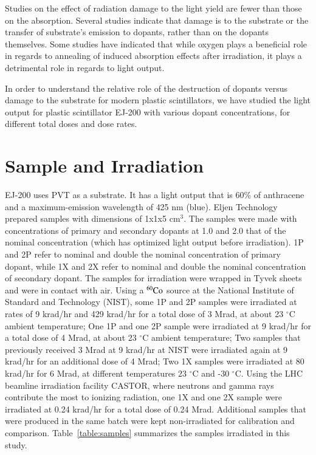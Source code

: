 \documentclass[review]{elsarticle}
\begin{document}
Studies on the effect of radiation damage to the light yield are fewer than those on the absorption. 
Several studies indicate that damage is to the substrate or the transfer of substrate's emission to dopants, 
rather than on the dopants themselves.
Some studies have indicated that while oxygen plays a beneficial role in regards to annealing of induced absorption effects after 
irradiation, it plays a detrimental role in regards to light output\cite{Biagtan1996125}. 

In order to understand the relative role of the destruction of dopants versus damage to the substrate for modern plastic scintillators, 
we have studied the light output for plastic scintillator EJ-200 with various dopant concentrations, 
for different total doses and dose rates. 

\section{Sample and Irradiation}
EJ-200 uses PVT as a substrate. It has a light output that is 60\% of anthracene and a maximum-emission wavelength of 425 nm (blue). 
Eljen Technology prepared samples with dimensions of 1x1x5 cm$^{3}$. 
The samples were made with concentrations of primary and secondary dopants at 1.0 and 2.0 that of 
the nominal concentration (which has optimized light output before irradiation). 
1P and 2P refer to nominal and double the nominal concentration of primary dopant, 
while 1X and 2X refer to nominal and double the nominal concentration of secondary dopant.
The samples for irradiation were wrapped in Tyvek sheets and were in contact with air.
Using a $\rm {^{60}Co}$ source at the National Institute of Standard and Technology (NIST), some 1P and 2P samples were irradiated 
at rates of 9 krad/hr and 429 krad/hr for a total dose of 3 Mrad, at about 23 $^\circ$C ambient temperature;  
One 1P and one 2P sample were irradiated at 9 krad/hr for a total dose of 4 Mrad, at about 23 $^\circ$C ambient temperature; 
Two samples that previously received 3 Mrad at 9 krad/hr at NIST were irradiated again at 9 krad/hr for an additional dose of 4 Mrad;
Two 1X samples were irradiated at 80 krad/hr for 6 Mrad, at different temperatures 23 $^\circ$C and -30 $^\circ$C.
Using the LHC beamline irradiation facility CASTOR, where neutrons and gamma rays contribute the most to ionizing radiation, 
one 1X and one 2X sample were irradiated at 0.24 krad/hr for a total dose of 0.24 Mrad. 
Additional samples that were produced in the same batch were kept non-irradiated for calibration and comparison.
Table~\ref{table:samples} summarizes the samples irradiated in this study.
\end{document}
